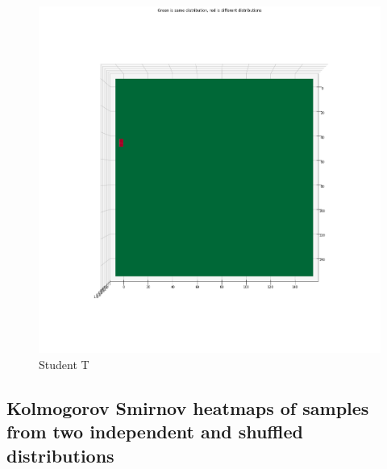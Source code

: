 \clearpage
\begin{figure}[htb]
  \centering
  \includegraphics[width=\linewidth]{./img/hypothesis_test/appendix/ks_student_t.png}
  \caption{Student T}
\end{figure}
\clearpage

\subsection{Kolmogorov Smirnov heatmaps of samples from two independent and shuffled distributions}

